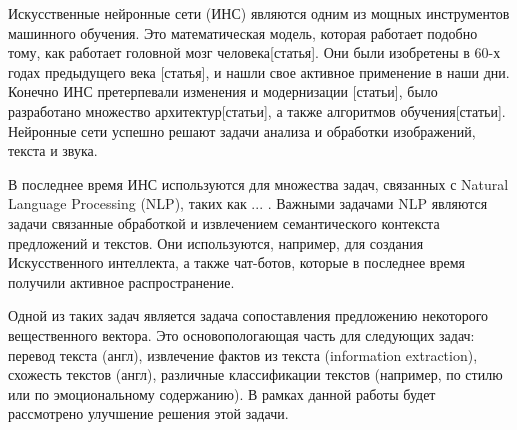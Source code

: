 \startprefacepage

Искусственные нейронные сети (ИНС) являются одним из мощных инструментов машинного
обучения.
Это математическая модель, которая работает подобно тому, как работает головной
мозг человека[статья].
Они были изобретены в 60-х годах предыдущего века [статья], и нашли свое активное
применение в наши дни. Конечно ИНС претерпевали изменения и модернизации
[статьи], было разработано множество архитектур[статьи], а также алгоритмов обучения[статьи].
Нейронные сети успешно решают задачи анализа и обработки изображений, текста и
звука.

В последнее время ИНС используются для множества задач, связанных с Natural
Language Processing (NLP), таких как ... . Важными задачами NLP являются задачи
связанные обработкой и извлечением семантического контекста предложений и
текстов.
Они используются, например, для создания Искусственного интеллекта, а также чат-ботов,
которые в последнее время получили активное распространение.

Одной из таких задач является задача сопоставления предложению некоторого
вещественного вектора. Это основопологающая часть для следующих
задач: перевод текста (англ), извлечение фактов из текста (information
extraction), схожесть текстов (англ), различные классификации текстов (например,
по стилю или по эмоциональному содержанию). В рамках данной работы будет
рассмотрено улучшение решения этой задачи.
